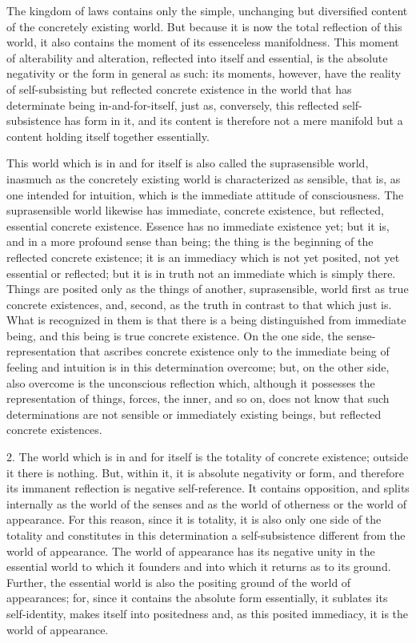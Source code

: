 The kingdom of laws contains only 
the simple, unchanging but diversified content
of the concretely existing world.
But because it is now the total reflection of this world,
it also contains the moment of its essenceless manifoldness. 
This moment of alterability and alteration, 
reflected into itself and essential,
is the absolute negativity
or the form in general as such:
its moments, however, have  the reality of
self-subsisting but reflected concrete existence
in the world  that has determinate being in-and-for-itself,
just as, conversely, this reflected 
self-subsistence has form in it,
and its content is therefore not a mere manifold 
but a content holding itself together essentially.

This world which is in and for itself is 
also called the suprasensible world,
inasmuch as the concretely existing world 
is characterized as sensible,
that is, as one intended for intuition,
which is the immediate attitude of consciousness.
The suprasensible world likewise has
immediate, concrete existence,
but reflected, essential concrete existence. 
Essence has no immediate existence yet;
but it is, and in a more profound sense than being;
the thing is the beginning of the reflected concrete existence;
it is an immediacy which is not yet posited,
not yet essential or reflected;
but it is in truth not an immediate which is simply there. 
Things are posited only as the
things of another, suprasensible, world
first as true concrete existences,
and, second, as the truth in contrast to that which just is.
What is recognized in them is that there is 
a being distinguished from immediate being,
and this being is true concrete existence.
On the one side, the sense-representation
that ascribes concrete existence 
only to the immediate being of
feeling and intuition is in this determination overcome; 
but, on the other side, also overcome is 
the unconscious reflection which, 
although it possesses the representation of things,
forces, the inner, and so on, does not know 
that such determinations are not sensible
or immediately existing beings, 
but reflected concrete existences.

2. The world which is in and for itself is
the totality of concrete existence;
outside it there is nothing.
But, within it, it is absolute negativity or form,
and therefore its immanent reflection is negative self-reference.
It contains opposition, and splits internally 
as the world of the senses and as the world of otherness
or the world of appearance.
For this reason, since it is totality,
it is also only one side of the totality 
and constitutes in this determination
a self-subsistence different from the world of appearance.
The world of appearance has its negative unity
in the essential world to which it founders
and into which it returns as to its ground.
Further, the essential world is also
the positing ground of the world of appearances;
for, since it contains the absolute form essentially,
it sublates its self-identity, makes itself into positedness
and, as this posited immediacy, it is the world of appearance.

